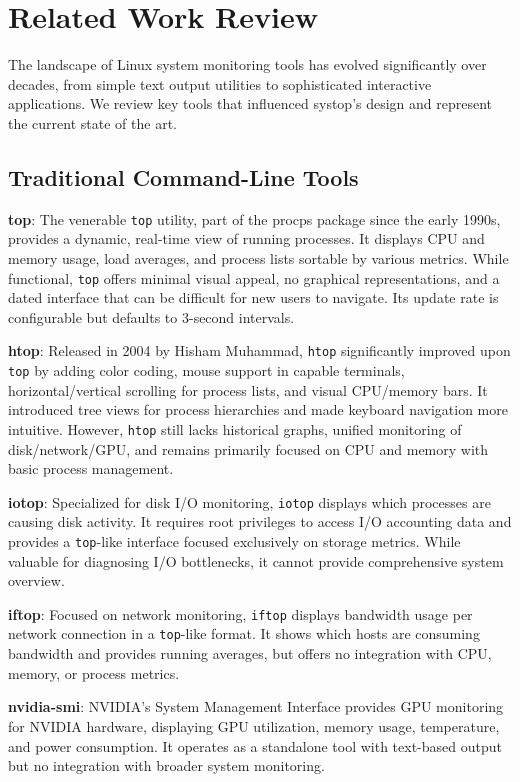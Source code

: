 \documentclass[12pt,a4paper,oneside]{report}
\begin{document}
\section{Related Work Review}
\label{sec:related-work}

The landscape of Linux system monitoring tools has evolved significantly over decades, from simple text output utilities to sophisticated interactive applications. We review key tools that influenced systop's design and represent the current state of the art.

\subsection{Traditional Command-Line Tools}

\textbf{top}: The venerable \texttt{top} utility, part of the procps package since the early 1990s, provides a dynamic, real-time view of running processes. It displays CPU and memory usage, load averages, and process lists sortable by various metrics. While functional, \texttt{top} offers minimal visual appeal, no graphical representations, and a dated interface that can be difficult for new users to navigate. Its update rate is configurable but defaults to 3-second intervals.

\textbf{htop}: Released in 2004 by Hisham Muhammad, \texttt{htop} significantly improved upon \texttt{top} by adding color coding, mouse support in capable terminals, horizontal/vertical scrolling for process lists, and visual CPU/memory bars. It introduced tree views for process hierarchies and made keyboard navigation more intuitive. However, \texttt{htop} still lacks historical graphs, unified monitoring of disk/network/GPU, and remains primarily focused on CPU and memory with basic process management.

\textbf{iotop}: Specialized for disk I/O monitoring, \texttt{iotop} displays which processes are causing disk activity. It requires root privileges to access I/O accounting data and provides a \texttt{top}-like interface focused exclusively on storage metrics. While valuable for diagnosing I/O bottlenecks, it cannot provide comprehensive system overview.

\textbf{iftop}: Focused on network monitoring, \texttt{iftop} displays bandwidth usage per network connection in a \texttt{top}-like format. It shows which hosts are consuming bandwidth and provides running averages, but offers no integration with CPU, memory, or process metrics.

\textbf{nvidia-smi}: NVIDIA's System Management Interface provides GPU monitoring for NVIDIA hardware, displaying GPU utilization, memory usage, temperature, and power consumption. It operates as a standalone tool with text-based output but no integration with broader system monitoring.
\end{document}
